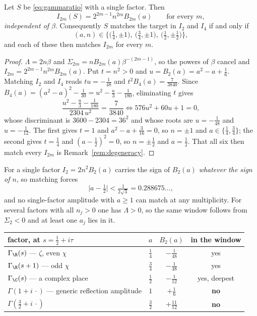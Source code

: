 \begin{theorem}\label{thm:onefactor}
Let $S$ be \eqref{eq:gammaratio} with a single factor. Then
\[
 I_{2m}(S)=2^{2m-1}n^{2m}B_{2m}(a)\qquad\text{for every }m,
\]
\emph{independent of $\beta$}. Consequently $S$ matches the target in $I_2$ and
$I_4$ if and only if
\[
 (a,n)\in\Big\{\big(\tfrac14,\pm1\big),\ \big(\tfrac34,\pm1\big),\
 \big(\tfrac12,\pm\tfrac12\big)\Big\},
\]
and each of these then matches $I_{2m}$ for every $m$.
\end{theorem}

\begin{proof}
$\Lambda=2n\beta$ and $\Sigma_{2m}=nB_{2m}(a)\beta^{-(2m-1)}$, so the powers of
$\beta$ cancel and $I_{2m}=2^{2m-1}n^{2m}B_{2m}(a)$. Put $t=n^2>0$ and
$u=B_2(a)=a^2-a+\frac16$. Matching $I_2$ and $I_4$ reads $tu=-\frac1{48}$ and
$t^2B_4(a)=\frac7{3840}$. Since $B_4(a)=(a^2-a)^2-\frac1{30}=u^2-\frac u3-\frac1{180}$,
eliminating $t$ gives
\[
 \frac{u^2-\frac u3-\frac1{180}}{2304\,u^2}=\frac7{3840}
 \iff 576u^2+60u+1=0,
\]
whose discriminant is $3600-2304=36^2$ and whose roots are $u=-\frac1{48}$ and
$u=-\frac1{12}$. The first gives $t=1$ and $a^2-a+\frac3{16}=0$, so $n=\pm1$ and
$a\in\{\frac14,\frac34\}$; the second gives $t=\frac14$ and $(a-\frac12)^2=0$, so
$n=\pm\frac12$ and $a=\frac12$. That all six then match every $I_{2m}$ is
Remark~\ref{rem:degeneracy}.
\end{proof}

\begin{corollary}\label{cor:signrule}
For a single factor $I_2=2n^2B_2(a)$ carries the sign of $B_2(a)$ \emph{whatever
the sign of $n$}, so matching forces
\[
 \Big|a-\tfrac12\Big|<\tfrac1{2\sqrt3}=0.288675\ldots,
\]
and no single-factor amplitude with $a\geq1$ can match at any multiplicity. For
several factors with all $n_j>0$ one has $\Lambda>0$, so the same window follows
from $\Sigma_2<0$ and at least one $a_j$ lies in it.
\end{corollary}

\begin{center}
\begin{tabular}{@{}lccc@{}}
\toprule
factor, at $s=\frac12+i\tau$ & $a$ & $B_2(a)$ & in the window\\
\midrule
$\Gamma_\R(s)$ --- $\zeta$, even $\chi$ & $\frac14$ & $-\frac1{48}$ & yes\\
$\Gamma_\R(s+1)$ --- odd $\chi$ & $\frac34$ & $-\frac1{48}$ & yes\\
$\Gamma_\C(s)$ --- a complex place & $\frac12$ & $-\frac1{12}$ & yes, deepest\\
$\Gamma(1+i\,\cdot)$ --- generic reflection amplitude & $1$ & $+\frac16$ & \textbf{no}\\
$\Gamma(\frac32+i\,\cdot)$ & $\frac32$ & $+\frac{11}{12}$ & \textbf{no}\\
\bottomrule
\end{tabular}
\end{center}

